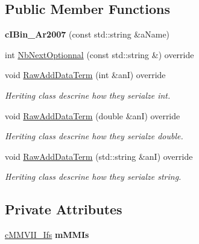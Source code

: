 \subsection*{Public Member Functions}
\begin{DoxyCompactItemize}
\item 
{\bfseries c\+I\+Bin\+\_\+\+Ar2007} (const std\+::string \&a\+Name)\hypertarget{classMMVII_1_1cIBin__Ar2007_a6317502046fbbaf334899f39d4985b20}{}\label{classMMVII_1_1cIBin__Ar2007_a6317502046fbbaf334899f39d4985b20}

\item 
int \hyperlink{classMMVII_1_1cIBin__Ar2007_a12c80b484d3e09bb68ba7733be143add}{Nb\+Next\+Optionnal} (const std\+::string \&) override
\item 
void \hyperlink{classMMVII_1_1cIBin__Ar2007_abd40f144f6cac89743cb1d5e565d5d44}{Raw\+Add\+Data\+Term} (int \&anI) override\hypertarget{classMMVII_1_1cIBin__Ar2007_abd40f144f6cac89743cb1d5e565d5d44}{}\label{classMMVII_1_1cIBin__Ar2007_abd40f144f6cac89743cb1d5e565d5d44}

\begin{DoxyCompactList}\small\item\em Heriting class descrine how they serialze int. \end{DoxyCompactList}\item 
void \hyperlink{classMMVII_1_1cIBin__Ar2007_a6a343b2620cefb17aaa0124380e1e3d4}{Raw\+Add\+Data\+Term} (double \&anI) override\hypertarget{classMMVII_1_1cIBin__Ar2007_a6a343b2620cefb17aaa0124380e1e3d4}{}\label{classMMVII_1_1cIBin__Ar2007_a6a343b2620cefb17aaa0124380e1e3d4}

\begin{DoxyCompactList}\small\item\em Heriting class descrine how they serialze double. \end{DoxyCompactList}\item 
void \hyperlink{classMMVII_1_1cIBin__Ar2007_a99d143c1ae15fa3087c6c6d80f6ccde8}{Raw\+Add\+Data\+Term} (std\+::string \&anI) override\hypertarget{classMMVII_1_1cIBin__Ar2007_a99d143c1ae15fa3087c6c6d80f6ccde8}{}\label{classMMVII_1_1cIBin__Ar2007_a99d143c1ae15fa3087c6c6d80f6ccde8}

\begin{DoxyCompactList}\small\item\em Heriting class descrine how they serialze string. \end{DoxyCompactList}\end{DoxyCompactItemize}
\subsection*{Private Attributes}
\begin{DoxyCompactItemize}
\item 
\hyperlink{classMMVII_1_1cMMVII__Ifs}{c\+M\+M\+V\+I\+I\+\_\+\+Ifs} {\bfseries m\+M\+M\+Is}\hypertarget{classMMVII_1_1cIBin__Ar2007_aedbe74c6110296796592f1ce76022a36}{}\label{classMMVII_1_1cIBin__Ar2007_aedbe74c6110296796592f1ce76022a36}

\end{DoxyCompactItemize}

